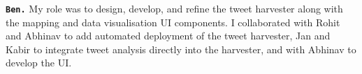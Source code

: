 \textbf{\texttt{Ben.}}
My role was to design, develop, and refine the tweet harvester along with the mapping and data visualisation UI components. I collaborated with Rohit and Abhinav to add automated deployment of the tweet harvester, Jan and Kabir to integrate tweet analysis directly into the harvester, and with Abhinav to develop the UI.
